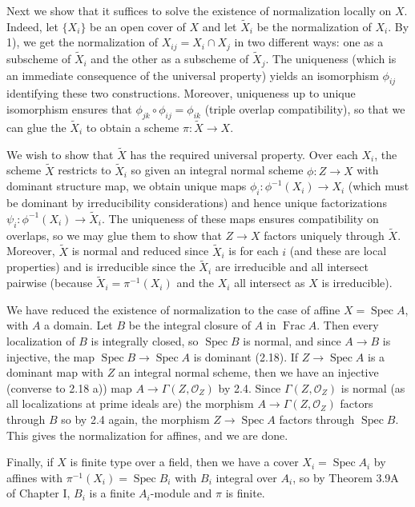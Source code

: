 \documentclass{report}
\renewcommand{\O}{\mathcal{O}}
\DeclareMathOperator{\Spec}{Spec}
\DeclareMathOperator{\Frac}{Frac}
\begin{document}
	Next we show that it suffices to solve the existence of normalization locally on $X$.		Indeed, let $\{X_i\}$
	be an open cover of $X$ and let $\widetilde{X}_i$ be the normalization of $X_i$.
	By 1), we get the normalization of $X_{ij}=X_i\cap X_j$ in two different ways: one
	as a subscheme of $\widetilde{X}_i$ and the other as a subscheme of $\widetilde{X}_j$.
	The uniqueness (which is an immediate consequence of the universal property) yields 
	an isomorphism $\phi_{ij}$ identifying these two constructions.	Moreover, 
	uniqueness up to unique isomorphism ensures that $\phi_{jk}\circ \phi_{ij}=\phi_{ik}$
	(triple overlap compatibility), so that we can glue the $\widetilde{X}_i$ to obtain a scheme 
	$\pi:\widetilde{X}\rightarrow X$.
	
	We wish to show that $\widetilde{X}$ has the required universal property.	Over each $X_i$,
	the scheme $\widetilde{X}$ restricts to $\widetilde{X}_i$ so given an integral normal
	scheme $\phi:Z\rightarrow X$ with dominant structure map, we obtain unique maps
	$\phi_i:\phi^{-1}(X_i)\rightarrow X_i$ (which must be dominant by irreducibility
	considerations) and hence unique factorizations $\psi_i:\phi^{-1}(X_i)\rightarrow \widetilde{X}_i$.
	The uniqueness of these maps ensures compatibility on overlaps, so we may glue them 
	to show that $Z\rightarrow X$ factors uniquely through $\widetilde{X}$.  Moreover, $\widetilde{X}$
	is normal and reduced since $\widetilde{X}_i$ is for each $i$ (and these are local properties)
	and is irreducible since the $\widetilde{X}_i$ are irreducible and all intersect pairwise (because
	$\widetilde{X}_i=\pi^{-1}(X_i)$ and the $X_i$ all intersect as $X$ is irreducible).

	We have reduced the existence of normalization to the case of affine $X=\Spec A$, with 
	$A$ a domain.	Let $B$ be the integral closure of $A$ in $\Frac A$.		Then
	every localization of $B$ is integrally closed, so $\Spec B$ is normal, and since $A\rightarrow B$
	is injective, the map $\Spec B\rightarrow \Spec A$ is dominant (2.18).	If $Z\rightarrow \Spec A$
	is a dominant map with $Z$ an integral normal scheme, then we have an injective (converse to 2.18 a)) map 
	$A\rightarrow \Gamma(Z,\O_Z)$ by 2.4.  Since $\Gamma(Z,\O_Z)$ is normal (as all localizations at prime ideals
	are) the morphism $A\rightarrow \Gamma(Z,\O_Z)$ factors through $B$ so by 2.4 again,
	the morphism $Z\rightarrow\Spec A$  factors through $\Spec B$.	This gives the normalization
	for affines, and we are done.
	
	Finally, if $X$ is finite type over a field, then we have a cover $X_i=\Spec A_i$ by affines with $\pi^{-1}(X_i)=\Spec B_i$
	with $B_i$ integral over $A_i$, so by Theorem 3.9A of Chapter I, $B_i$ is a finite $A_i$-module and $\pi$ is finite. 
\end{document}
